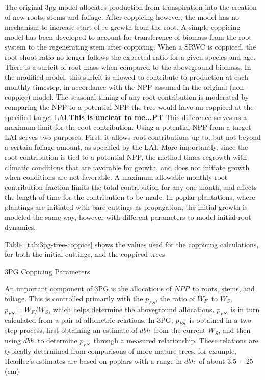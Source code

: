 \documentclass[preprint,12pt]{elsarticle}
\newcommand{\dbh}{\ensuremath{dbh}}
\newcommand{\NPP}{\ensuremath{NPP}}
\newcommand{\WF}{\ensuremath{W_F}}
\newcommand{\WS}{\ensuremath{W_S}}
\newcommand{\pfs}{\ensuremath{p_{FS}}}
\begin{document}
The original \ac{3pg} model allocates production from transpiration
into the creation of new roots, stems and foliage.  After coppicing
however, the model has no mechanism to increase start of re-growth
from the root.  A simple coppicing model has been developed to account
for transference of biomass from the root system to the regenerating
stem after coppicing.  When a \ac{SRWC} is coppiced, the root-shoot
ratio no longer follows the expected ratio for a given species and
age. There is a surfeit of root mass when compared to the aboveground
biomass.  In the modified model, this surfeit is allowed to contribute
to production at each monthly timestep, in accordance with the
\ac{NPP} assumed in the original (non-coppice) model.  The seasonal
timing of any root contribution is moderated by comparing the \ac{NPP}
to a potential \ac{NPP} the tree would have un-coppiced at the
specified target \ac{LAI}.\textbf{This is unclear to me...PT} This
difference serves as a maximum limit for the root contribution.  Using
a potential \ac{NPP} from a target \ac{LAI} serves two
purposes. First, it allows root contributions up to, but not beyond a
certain foliage amount, as specified by the \ac{LAI}.  More
importantly, since the root contribution is tied to a potential
\ac{NPP}, the method times regrowth with climatic conditions that are
favorable for growth, and does not initiate growth when conditions are
not favorable.  A maximum allowable monthly root contribution fraction
limits the total contribution for any one month, and affects the
length of time for the contribution to be made.  In poplar
plantations, where plantings are initiated with bare cuttings as
propagation, the initial growth is modeled the same way, however with
different parameters to model initial root dynamics.

Table~\ref{tab:3pg-tree-coppice} shows the values used for the
coppicing calculations, for both the initial cuttings, and the
coppiced trees.

\begin{table}%
\caption{3PG Coppicing Parameters}

\label{tab:3pg-tree-coppice}
 \end{table}


An important component of 3PG is the allocations of \NPP~to roots, stems, and
foliage.  This is controlled primarily with the \pfs, the ratio of \WF~to \WS,
$\pfs=\WF/\WS$, which helps determine the aboveground allocations.  \pfs~is in
turn calculated from a pair of allometric relations.  In 3PG, \pfs~is obtained
in a two step process, first obtaining an estimate of \dbh~from the current \WS,
and then using \dbh~to determine \pfs~through a measured relationship.  These
relations are typically determined from comparisons of more mature trees, for
example, Headlee's estimates are based on poplars with a range in \dbh~of about
3.5~-~25 (cm)~\cite{Headlee2012}%
\end{document}
